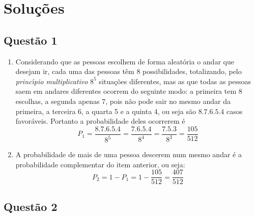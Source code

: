 \documentclass{report}
\begin{document}
\section{\color{red} Solu\c c\~oes}

\subsection{\color{red} Quest\~ao 1}

\begin{enumerate}

\item[(a)] Considerando que as pessoas escolhem de forma aleat\'oria o andar que desejam ir, cada uma das pessoas t\^em 8 possibilidades, totalizando, pelo {\it princ\'\i pio multiplicativo} $8^5$ situa\c c\~oes diferentes, mas as que todas as pessoas saem em andares diferentes ocorrem do seguinte modo: a primeira tem 8 escolhas, a segunda apenas 7, pois n\~ao pode sair no mesmo andar da primeira, a terceira 6, a quarta 5 e a quinta 4, ou seja s\~ao $8.7.6.5.4$ casos favor\'aveis. Portanto a probabilidade deles ocorrerem \'e $$P_1= \frac{8.7.6.5.4}{8^5}=\frac{7.6.5.4}{8^4}=\frac{7.5.3}{8^3}=\frac{105}{512}$$

\item[(b)] A probabilidade de mais de uma pessoa descerem num mesmo andar \'e a probabilidade complementar do item anterior, ou seja: $$P_2=1-P_1=1-\frac{105}{512}=\frac{407}{512}$$

\end{enumerate}

\subsection{\color{red} Quest\~ao 2}
\end{document}
